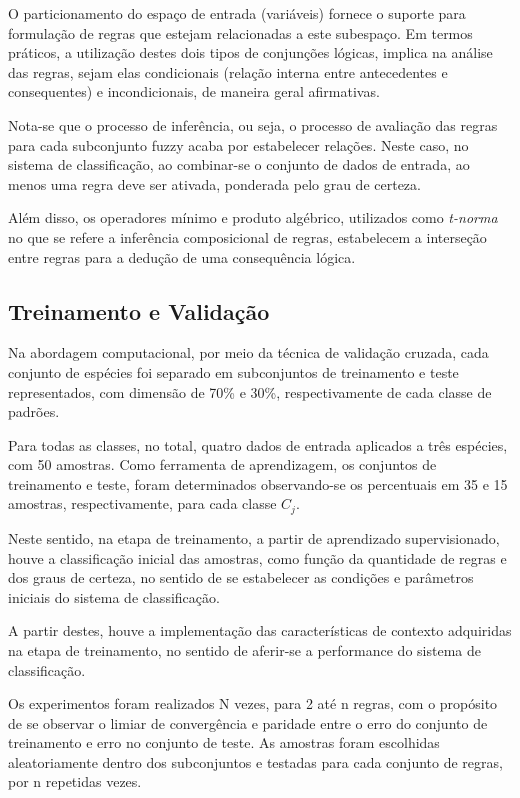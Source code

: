 \documentclass[12pt,a4paper]{article}
\numberwithin{equation}{section}
\begin{document}
O particionamento do espaço de entrada (variáveis) fornece o suporte para formulação de regras que estejam relacionadas a este subespaço. Em termos práticos, a utilização destes dois tipos de conjunções lógicas, implica na análise das regras, sejam elas condicionais (relação interna entre antecedentes e consequentes) e incondicionais, de maneira geral afirmativas. 

Nota-se que o processo de inferência, ou seja, o processo de avaliação das regras para cada subconjunto fuzzy acaba por estabelecer relações. Neste caso, no sistema de classificação, ao combinar-se o conjunto de dados de entrada, ao menos uma regra deve ser ativada, ponderada pelo grau de certeza.

Além disso, os operadores mínimo e produto algébrico, utilizados como \textit{t-norma} no que se refere a inferência composicional de regras, estabelecem a interseção entre regras para a dedução de uma consequência lógica.

\subsection{Treinamento e Validação}
\label{subsection:training}

Na abordagem computacional, por meio da técnica de validação cruzada, cada conjunto de espécies foi separado em subconjuntos de treinamento e teste representados, com dimensão de 70\% e 30\%, respectivamente de cada classe de padrões.

Para todas as classes, no total, quatro dados de entrada aplicados a três espécies, com 50 amostras. Como ferramenta de aprendizagem, os conjuntos de treinamento e teste, foram determinados observando-se os percentuais em 35 e 15 amostras, respectivamente, para cada classe $C_{j}$.

Neste sentido, na etapa de treinamento, a partir de aprendizado supervisionado, houve a classificação inicial das amostras, como função da quantidade de regras e dos graus de certeza, no sentido de se estabelecer as condições e parâmetros iniciais do sistema de classificação.

A partir destes, houve a implementação das características de contexto adquiridas na etapa de treinamento, no sentido de aferir-se a performance do sistema de classificação.

Os experimentos foram realizados N vezes, para 2 até n regras, com o propósito de se observar o limiar de convergência e paridade entre o erro do conjunto de treinamento e erro no conjunto de teste. As amostras foram escolhidas aleatoriamente dentro dos subconjuntos e testadas para cada conjunto de regras, por n repetidas vezes.
\end{document}
